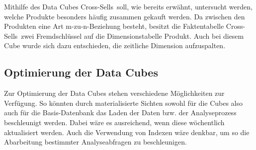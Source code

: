 Mithilfe des Data Cubes \glqq Cross-Sells\grqq ~soll, wie bereits erwähnt, untersucht werden, welche Produkte besonders häufig zusammen gekauft werden. Da zwischen den Produkten eine Art m-zu-n-Beziehung besteht, besitzt die Faktentabelle \glqq Cross-Sells\grqq ~zwei Fremdschlüssel auf die Dimensionstabelle \glqq Produkt\grqq . Auch bei diesem Cube wurde sich dazu entschieden, die zeitliche Dimension aufzuspalten.
  
\subsection{Optimierung der Data Cubes}
Zur Optimierung der Data Cubes stehen verschiedene Möglichkeiten zur Verfügung. So könnten durch materialisierte Sichten sowohl für die Cubes also auch für die Basis-Datenbank das Laden der Daten bzw. der Analyseprozess beschleunigt werden. Dabei wäre es ausreichend, wenn diese wöchentlich aktualisiert werden. Auch die Verwendung von Indexen wäre denkbar, um so die Abarbeitung bestimmter Analyseabfragen zu beschleunigen.